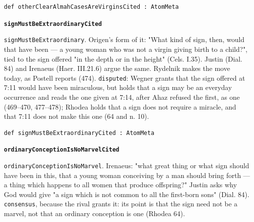 \documentclass[11pt]{article}
\begin{document}
{\small\begin{verbatim}
def otherClearAlmahCasesAreVirginsCited : AtomMeta
\end{verbatim}}
\par\medskip\noindent\textbf{\texttt{sign\allowbreak{}Must\allowbreak{}Be\allowbreak{}Extraordinary\allowbreak{}Cited}}\par\nobreak\noindent
\texttt{sign\allowbreak{}Must\allowbreak{}Be\allowbreak{}Extraordinary}. Origen's form of it: "What kind of sign, then, would that have been — a young woman who was not a virgin giving birth to a child?", tied to the sign offered "in the depth or in the height" (Cels. I.35). Justin (Dial. 84) and Irenaeus (Haer. III.21.6) argue the same. Rydelnik makes the move today, as Postell reports (474). \texttt{disputed}: Wegner grants that the sign offered at 7:11 would have been miraculous, but holds that a sign may be an everyday occurrence and reads the one given at 7:14, after Ahaz refused the first, as one (469–470, 477–478); Rhodea holds that a sign does not require a miracle, and that 7:11 does not make this one (64 and n. 10).

{\small\begin{verbatim}
def signMustBeExtraordinaryCited : AtomMeta
\end{verbatim}}
\par\medskip\noindent\textbf{\texttt{ordinary\allowbreak{}Conception\allowbreak{}Is\allowbreak{}No\allowbreak{}Marvel\allowbreak{}Cited}}\par\nobreak\noindent
\texttt{ordinary\allowbreak{}Conception\allowbreak{}Is\allowbreak{}No\allowbreak{}Marvel}. Irenaeus: "what great thing or what sign should have been in this, that a young woman conceiving by a man should bring forth — a thing which happens to all women that produce offspring?" Justin asks why God would give "a sign which is not common to all the first-born sons" (Dial. 84). \texttt{consensus}, because the rival grants it: its point is that the sign need not be a marvel, not that an ordinary conception is one (Rhodea 64).
\end{document}
